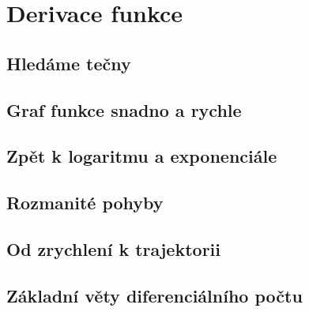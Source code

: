 \setchaptertoc
\chapter{Derivace funkce}\label{mai:IchapV}
  \section{Hledáme tečny}\label{mai:IchapVsecI}
  \section{Graf funkce snadno a rychle}\label{mai:IchapVsecII}
  \section{Zpět k logaritmu a exponenciále}\label{mai:IchapVsecV}
  \section{Rozmanité pohyby}\label{mai:IchapVsecVI}
  \section{Od zrychlení k trajektorii}\label{mai:IchapVsecVII}

  \section{Základní věty diferenciálního počtu}\label{mai:IchapVsecVIII}
